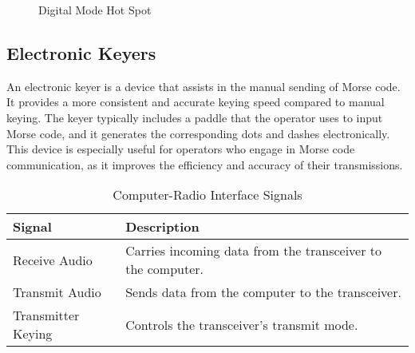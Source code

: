 \begin{figure}[h]
    \centering
    \caption{Digital Mode Hot Spot}
    \label{fig:digital_hot_spot}
\end{figure}

\subsection*{Electronic Keyers}
An electronic keyer is a device that assists in the manual sending of Morse code. It provides a more consistent and accurate keying speed compared to manual keying. The keyer typically includes a paddle that the operator uses to input Morse code, and it generates the corresponding dots and dashes electronically. This device is especially useful for operators who engage in Morse code communication, as it improves the efficiency and accuracy of their transmissions.

\begin{table}[h]
    \centering
    \begin{tabular}{|l|l|}
        \hline
        \textbf{Signal} & \textbf{Description} \\
        \hline
        Receive Audio & Carries incoming data from the transceiver to the computer. \\
        Transmit Audio & Sends data from the computer to the transceiver. \\
        Transmitter Keying & Controls the transceiver's transmit mode. \\
        \hline
    \end{tabular}
    \caption{Computer-Radio Interface Signals}
    \label{tab:computer_radio_interface}
\end{table}

